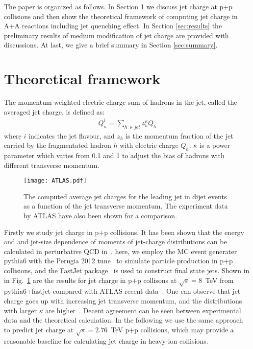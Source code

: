 \documentclass[3p,times,twocolumn]{elsarticle}
\begin{document}
The paper is organized as follows. In Section \ref{sec:theory} we discuss jet charge at p+p collisions and then show the theoretical framework of computing jet charge in A+A reactions including jet quenching effect. In Section \ref{sec:results} the preliminary results of medium modification of jet charge are provided with discussions. At last, we give a brief summary in Section \ref{sec:summary}.


\section{Theoretical framework}
\label{sec:theory}

The momentum-weighted electric charge sum of hadrons in the jet,
called the averaged jet charge, is defined as:
\begin{eqnarray}
Q^{i}_{\kappa}=\sum_{ h \ \in jet}z^{\kappa}_{h}Q_{h}
\label{TAB}
\end{eqnarray}
where $i$ indicates the jet flavour, and $z_h$ is the momentum fraction of the jet carried by the fragmentated hadron $h$ with electric charge $Q_{h}$. $\kappa$ is a power parameter  which varies from 0.1 and 1 to adjust the bias of hadrons with different transverse momentum.

\begin{figure}[!htb]
\centerline{
\texttt{[image: ATLAS.pdf]}
}
\caption{The computed average jet charges for the leading jet
in dijet events as a function of the jet transverse momentum. The experiment data by ATLAS have also been shown for a comparison.}
\label{fig:ATLAS}
\end{figure}

Firstly we study jet charge in p+p collisions. It has been shown that
the energy and and jet-size dependence of moments of jet-charge distributions can be
calculated in perturbative QCD in~\cite{Krohn:2012fg}.
here, we employ the MC event generater pythia6
with the Perugia 2012 tune~\cite{Skands:2010ak} to
simulate particle production in p+p collisions, and the FastJet package~\cite{Cacciari:2008gp} is used to construct final state jets.
Shown in in Fig.~\ref{fig:ATLAS} are the results for jet charge in p+p collisons at $\sqrt{s}=8$~TeV from {\sc pythia6+fastjet}
compared with ATLAS recent data~\cite{Aad:2015cua}. One can observe that jet charge goes up with increasing jet transverse momentum, and the distributions with larger $\kappa$ are higher~\cite{Chen:2016}.
Decent agreement can be seen between experimental data and the theoretical calculation.  In the following we use the same approach to predict jet charge
at $\sqrt{s}=2.76$~TeV p+p collisions, which may provide a reasonable baseline for calculating jet charge in heavy-ion collisions.
\end{document}
